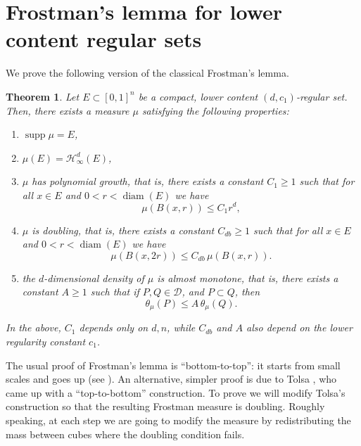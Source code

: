 \documentclass[11pt,reqno]{amsart}
\DeclareMathOperator{\diam}{diam}
\newtheorem{theorem}{Theorem}[section]
\theoremstyle{definition}
\theoremstyle{remark}
\numberwithin{equation}{section}
\newcommand{\hdc}{\mathcal{H}^d_\infty}
\newcommand{\DD}{\mathcal{D}}
\DeclareMathOperator{\supp}{supp}
\theoremstyle{theorem}
\theoremstyle{definition}
\theoremstyle{remark}
\numberwithin{equation}{section}
\begin{document}
\appendix

\section{Frostman's lemma for lower content regular sets}\label{appendix}
We prove the following version of the classical Frostman's lemma.
\begin{theorem}\label{theorem:Frostman measure}
	Let $E\subset [0,1]^n$ be a compact, lower content $(d,c_1)$-regular set. Then, there exists a measure $\mu$ satisfying the following properties:
	\begin{enumerate}
		\item \label{i:spt} $\supp\mu = E$,
		\item \label{i:mu-diam} $\mu(E) = \hdc(E)$,
		\item \label{i:poly-growth} $\mu$ has polynomial growth, that is, there exists a constant $C_1\ge 1$ such that for all $x\in E$ and $0<r<\diam(E)$ we have
		\begin{equation*}
			\mu(B(x,r))\le C_1 r^d,
		\end{equation*}
		\item \label{i:doubling2} $\mu$ is doubling, that is, there exists a constant $C_{db}\ge 1$ such that for all $x\in E$ and $0<r<\diam(E)$ we have
		\begin{equation}
			\mu(B(x,2r))\le C_{db}\, \mu(B(x,r)).
		\end{equation}
		\item \label{it:density2} the $d$-dimensional density of $\mu$ is almost monotone, that is, there exists a constant $A\ge 1$ such that if $P, Q\in\DD$, and $P\subset Q$, then
		\begin{equation*}
			\theta_\mu(P)\le A\, \theta_\mu(Q).
		\end{equation*} 
	\end{enumerate}
	In the above, $C_1$ depends only on $d,n$, while $C_{db}$ and $A$ also depend on the lower regularity constant $c_1$.
\end{theorem}
%
%
%
%
%
%
%
%

The usual proof of Frostman's lemma is ``bottom-to-top'': it starts from small scales and goes up (see \cite[Theorem 8.8]{mattila}). An alternative, simpler proof is due to Tolsa \cite[Theorem 1.23]{tolsa2014analytic}, who came up with a ``top-to-bottom'' construction. To prove  we will modify Tolsa's construction so that the resulting Frostman measure is doubling. Roughly speaking, at each step we are going to modify the measure by redistributing the mass between cubes where the doubling condition fails.
\end{document}
